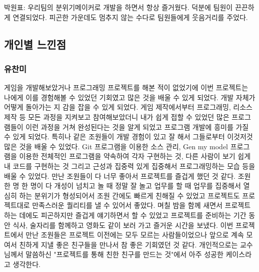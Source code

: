 \documentclass[10pt,oneside,a4paper,titlepage]{article}
\begin{document}
박원표: 우리팀의 분위기메이커로 개발을 하면서 항상 즐거웠다. 덕분에 팀원이 끈끈하게 연결되었다. 피곤한 가운데도 멈추지 않는 수다로 팀원들에게 웃음거리를 주었다. 

\subsection{개인별 느낀점}

\subsubsection{유찬미}
게임을 개발해보았거나 프로그래밍 프로젝트를 해본 적이 없었기에 이번 프로젝트는 나에게 이를 경험해볼 수 있었던 기회였고 많은 것을 배울 수 있게 되었다. 
개발 자체가 어떻게 돌아가는 지 감을 잡을 수 있게 되었다. 게임 제작에서부터 프로그래밍, 리소스 제작 등 모든 과정을 지켜보고 참여해보았더니 내가 쉽게 접할 수 있었던 많은 프로그램들이 이런 과정을 거쳐 완성된다는 것을 알게 되었고 프로그램 개발에 흥미를 가질 수 있게 되었다. 특히나 같은 조원들이 개발 경험이 있고 잘 해서 그들로부터 이것저것 많은 것을 배울 수 있었다. Git 프로그램을 이용한 소스 관리, Gen my model 프로그램을 이용한 전체적인 프로그램을 약속하여 각자 구현하는 것, 다른 사람이 보기 쉽게 내 코드를 구현하는 것 그리고 근성과 집중력 있게 집중해서 프로그래밍하는 모습 등을 배울 수 있었다.
만난 조원들이 다 너무 좋아서 프로젝트를 즐겁게 했던 것 같다. 조원 한 명 한 명이 다 개성이 넘치고 놀 때 정말 잘 놀고 업무를 할 때 업무를 집중해서 열심히 하는 분위기가 형성되어서 조원 간에도 빠르게 친해질 수 있었고 프로젝트도 프로젝트대로 만족스러운 퀄리티를 낼 수 있어서 좋았다. 며칠 밤을 함께 새면서 프로젝트 하는 데에도 피곤하지만 즐겁게 얘기하면서 할 수 있었고 프로젝트를 준비하는 기간 동안 식사, 술자리를 함께하고 영화도 같이 보러 가고 즐거운 시간을 보냈다. 이번 프로젝트에서 만난 조원들은 프로젝트 이전에는 모두 모르는 사람들이었으나 앞으로 계속 모여서 친하게 지낼 좋은 친구들을 만나서 참 좋은 기회였던 것 같다. 개인적으로는 교수님께서 말씀하신 "프로젝트를 통해 친한 친구를 만드는 것"에서 아주 성공한 케이스라고 생각한다.
\end{document}
